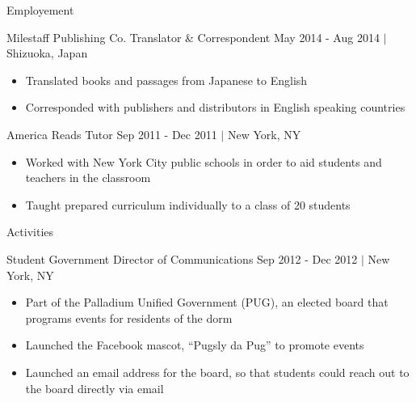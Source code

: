 \documentclass {vangogh500-resume}
\begin{document}
\begin{minipage}[t]{0.64\textwidth}
	\begin {newcategory} {Employement}
		\begin {job} {Milestaff Publishing Co.} {Translator \& Correspondent}
			May 2014 - Aug 2014 $|$ Shizuoka, Japan
			\vspace{-\topsep}
			\begin{itemize}
				\itemsep1pt \parskip0pt 
				\item Translated books and passages from Japanese to English
				\item Corresponded with publishers and distributors in English speaking countries
			\end{itemize}
		\end {job}
		\begin {job} {America Reads} {Tutor}
			Sep 2011 - Dec 2011 $|$ New York, NY
			\vspace{-\topsep}
			\begin{itemize}
				\itemsep1pt \parskip0pt 
				\item Worked with New York City public schools in order to aid students and teachers in the classroom
				\item Taught prepared curriculum individually to a class of 20 students
			\end{itemize}
			\vspace{15pt}
		\end {job}
	\end {newcategory}
	\begin {newcategory} {Activities}
		\begin{job} {Student Government} {Director of Communications}
			Sep 2012 - Dec 2012 $|$ New York, NY
			\vspace{-\topsep}
			\begin{itemize}
				\itemsep1pt \parskip0pt 
				\item Part of the Palladium Unified Government (PUG), an elected board that programs events for residents of the dorm
				\item Launched the Facebook mascot, ``Pugsly da Pug'' to promote events
				\item Launched an email address for the board, so that students could reach out to the board directly via email

\end{itemize}
\end{job}
\end{newcategory}
\end{minipage}
\end{document}
